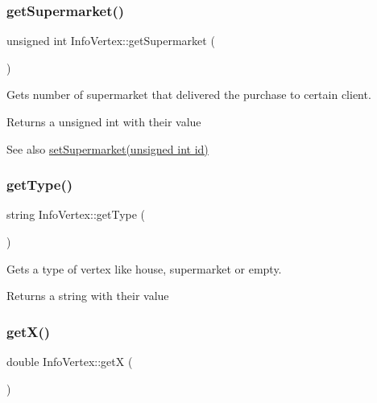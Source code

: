 \subsubsection{\texorpdfstring{get\+Supermarket()}{getSupermarket()}}
{\footnotesize\ttfamily unsigned int Info\+Vertex\+::get\+Supermarket (\begin{DoxyParamCaption}{ }\end{DoxyParamCaption})}



Gets number of supermarket that delivered the purchase to certain client. 

\begin{DoxyReturn}{Returns}
a unsigned int with their value 
\end{DoxyReturn}
\begin{DoxySeeAlso}{See also}
\hyperlink{class_info_vertex_a76710ab50065ffbb8d41bb998fe55a79}{set\+Supermarket(unsigned int id)} 
\end{DoxySeeAlso}
\hypertarget{class_info_vertex_a6ec232d3de8b3f747d4ca57f1616bc78}{}\label{class_info_vertex_a6ec232d3de8b3f747d4ca57f1616bc78} 
\subsubsection{\texorpdfstring{get\+Type()}{getType()}}
{\footnotesize\ttfamily string Info\+Vertex\+::get\+Type (\begin{DoxyParamCaption}{ }\end{DoxyParamCaption})}



Gets a type of vertex like house, supermarket or empty. 

\begin{DoxyReturn}{Returns}
a string with their value 
\end{DoxyReturn}
\hypertarget{class_info_vertex_ac9a026e3422d6d7f40942bfc049c90f3}{}\label{class_info_vertex_ac9a026e3422d6d7f40942bfc049c90f3} 
\subsubsection{\texorpdfstring{get\+X()}{getX()}}
{\footnotesize\ttfamily double Info\+Vertex\+::getX (\begin{DoxyParamCaption}{ }\end{DoxyParamCaption})}



